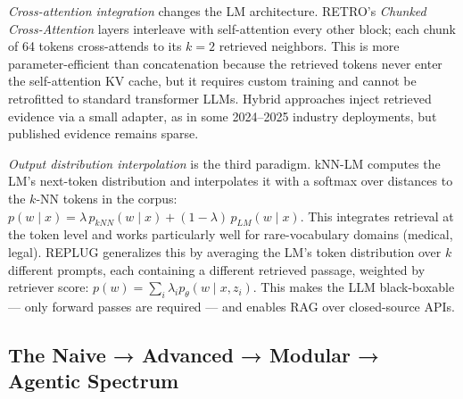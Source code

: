 \documentclass{article}
\begin{document}
\emph{Cross-attention integration} changes the LM architecture. RETRO's \emph{Chunked Cross-Attention} layers interleave with self-attention every other block; each chunk of 64 tokens cross-attends to its \(k=2\) retrieved neighbors. This is more parameter-efficient than concatenation because the retrieved tokens never enter the self-attention KV cache, but it requires custom training and cannot be retrofitted to standard transformer LLMs. Hybrid approaches inject retrieved evidence via a small adapter, as in some 2024--2025 industry deployments, but published evidence remains sparse.

\emph{Output distribution interpolation} is the third paradigm. kNN-LM \citep{khandelwal2020generalizationthro} computes the LM's next-token distribution and interpolates it with a softmax over distances to the \(k\)-NN tokens in the corpus: \(p(w \mid x) = \lambda \, p_{kNN}(w \mid x) + (1 - \lambda) \, p_{LM}(w \mid x)\). This integrates retrieval at the token level and works particularly well for rare-vocabulary domains (medical, legal). REPLUG generalizes this by averaging the LM's token distribution over \(k\) different prompts, each containing a different retrieved passage, weighted by retriever score: \(p(w) = \sum_i \lambda_i p_\theta(w \mid x, z_i)\). This makes the LLM black-boxable --- only forward passes are required --- and enables RAG over closed-source APIs.

\subsection{The Naive → Advanced → Modular → Agentic Spectrum}\label{the-naive-advanced-modular-agentic-spectrum}
\end{document}
